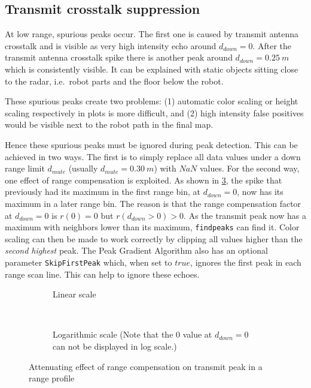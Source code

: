 
\subsection{Transmit crosstalk suppression}\label{transmit-crosstalk-suppression}

At low range, spurious peaks occur. The first one is caused by transmit
antenna crosstalk and is visible as very high intensity echo around
\(d_{down}=0\). After the transmit antenna crosstalk spike there is
another peak around \(d_{down}=\SI{0.25}{m}\) which is consistently visible. It
can be explained with static objects sitting close to the radar,
i.e.~robot parts and the floor below the robot.

These spurious peaks create two problems: (1) automatic color scaling or
height scaling respectively in plots is more difficult, and (2) high
intensity false positives would be visible next to the robot path in the
final map.

Hence these spurious peaks must be ignored during peak detection. This
can be achieved in two ways. The first is to simply replace all data
values under a down range limit \(d_{mute}\) (usually
\(d_{mute}=\SI{0.30}{m}\)) with \(NaN\) values. For the second way, one effect
of range compensation is exploited. As shown in \cref{fig:fig_range_compensation_transmit_spike}, the spike
that previously had its maximum in the first range bin, at
\(d_{down}=0\), now has its maximum in a later range bin. The reason is
that the range compensation factor at \(d_{down}=0\) is \(r(0) = 0\) but
\(r(d_{down}>0) > 0\). As the transmit peak now has a maximum with
neighbors lower than its maximum, \texttt{findpeaks} can find it. Color
scaling can then be made to work correctly by clipping all values higher
than the \emph{second highest} peak. The Peak Gradient Algorithm also
has an optional parameter \texttt{SkipFirstPeak} which, when set to
\(true\), ignores the first peak in each range scan line. This can help
to ignore these echoes.

\begin{figure}[htbp]
    \centering
    \begin{subfigure}[t]{\textwidth}
        \centering
        \def\svgscale{.8}
        
        \caption{Linear scale}
        \label{fig:fig_range_compensation_transmit_spike_1}
    \end{subfigure}\bigskip\\
    \begin{subfigure}[t]{\textwidth}
        \centering
        \def\svgscale{.8}
        
        \caption{Logarithmic scale (Note that the \(0\) value at \(d_{down}=0\) can not be displayed in log scale.)}
        \label{fig:fig_range_compensation_transmit_spike_2}
    \end{subfigure}
    \caption{Attenuating effect of range compensation on transmit peak in a range profile}
    \label{fig:fig_range_compensation_transmit_spike}
\end{figure}


